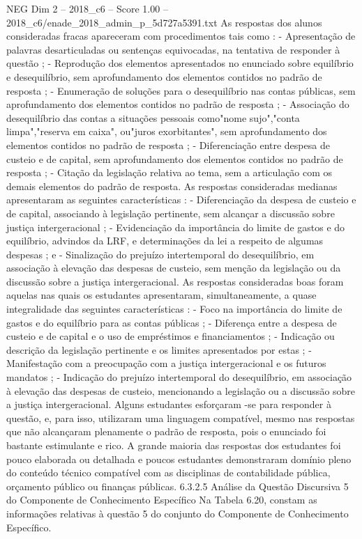 \begin{textsample}{NEG Dim 2 – 2018\_c6 – Score 1.00 – 2018\_c6/enade\_2018\_admin\_p\_5d727a5391.txt}
As respostas dos alunos consideradas fracas apareceram com procedimentos tais como : - Apresentação de palavras desarticuladas ou sentenças equivocadas, na tentativa de responder à questão ; - Reprodução dos elementos apresentados no enunciado sobre equilíbrio e desequilíbrio, sem aprofundamento dos elementos contidos no padrão de resposta ; - Enumeração de soluções para o desequilíbrio nas contas públicas, sem aprofundamento dos elementos contidos no padrão de resposta ; - Associação do desequilíbrio das contas a situações pessoais como"nome sujo","conta limpa","reserva em caixa", ou"juros exorbitantes", sem aprofundamento dos elementos contidos no padrão de resposta ; - Diferenciação entre despesa de custeio e de capital, sem aprofundamento dos elementos contidos no padrão de resposta ; - Citação da legislação relativa ao tema, sem a articulação com os demais elementos do padrão de resposta.
As respostas consideradas medianas apresentaram as seguintes características : - Diferenciação da despesa de custeio e de capital, associando à legislação pertinente, sem alcançar a discussão sobre justiça intergeracional ; - Evidenciação da importância do limite de gastos e do equilíbrio, advindos da LRF, e determinações da lei a respeito de algumas despesas ; e - Sinalização do prejuízo intertemporal do desequilíbrio, em associação à elevação das despesas de custeio, sem menção da legislação ou da discussão sobre a justiça intergeracional.
As respostas consideradas boas foram aquelas nas quais os estudantes apresentaram, simultaneamente, a quase integralidade das seguintes características : - Foco na importância do limite de gastos e do equilíbrio para as contas públicas ; - Diferença entre a despesa de custeio e de capital e o uso de empréstimos e financiamentos ; - Indicação ou descrição da legislação pertinente e os limites apresentados por estas ; - Manifestação com a preocupação com a justiça intergeracional e os futuros mandatos ; - Indicação do prejuízo intertemporal do desequilíbrio, em associação à elevação das despesas de custeio, mencionando a legislação ou a discussão sobre a justiça intergeracional.
Alguns estudantes esforçaram -se para responder à questão, e, para isso, utilizaram uma linguagem compatível, mesmo nas respostas que não alcançaram plenamente o padrão de resposta, pois o enunciado foi bastante estimulante e rico.
A grande maioria das respostas dos estudantes foi pouco elaborada ou detalhada e poucos estudantes demonstraram domínio pleno do conteúdo técnico compatível com as disciplinas de contabilidade pública, orçamento público ou finanças públicas. 6.3.2.5 Análise da Questão Discursiva 5 do Componente de Conhecimento Específico Na Tabela 6.20, constam as informações relativas à questão 5 do conjunto do Componente de Conhecimento Específico.

\end{textsample}
